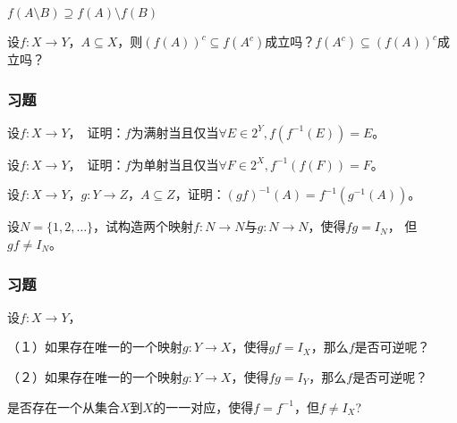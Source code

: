 \documentclass{beamer}
\begin{document}
\begin{CJK*}{UTF8}{gbsn}
\begin{frame}
\begin{Exercise}
    $f(A \setminus B) \supseteq f(A) \setminus f(B)$
    
  \end{Exercise}
  \begin{Exercise}
    设$f:X\to Y$，$A \subseteq X$，则$(f(A))^c \subseteq f(A^c)$成立吗？$ f(A^c)\subseteq (f(A))^c$成立吗？
  \end{Exercise}

\end{frame}

\begin{frame}
  \frametitle{习题}
  \begin{Exercise}
    设$f:X\to Y$，　证明：$f$为满射当且仅当$\forall E \in 2^Y, f(f^{-1}(E)) = E$。
  \end{Exercise}

  \begin{Exercise}
    设$f:X\to Y$，　证明：$f$为单射当且仅当$\forall F \in 2^X, f^{-1}(f(F)) = F$。    
  \end{Exercise}
    \begin{Exercise}
    设$f:X \to Y$，$g:Y \to Z$，$A \subseteq Z$，证明：$(gf)^{-1}(A) = f^{-1}(g^{-1}(A))$。
  \end{Exercise}
  \begin{Exercise}
    设$N=\{1,2,\ldots\}$，试构造两个映射$f:N \to N$与$g:N\to N$，使得$fg = I_N$，
    但$gf \neq I_N$。
  \end{Exercise}
\end{frame}
\begin{frame}
  \frametitle{习题}
 \begin{Exercise}
    设$f:X \to Y$，

    （１）如果存在唯一的一个映射$g:Y\to X$，使得$gf = I_X$，那么$f$是否可逆呢？

    （２）如果存在唯一的一个映射$g:Y\to X$，使得$fg = I_Y$，那么$f$是否可逆呢？

  \end{Exercise}
  \begin{Exercise}
    是否存在一个从集合$X$到$X$的一一对应，使得$f=f^{-1}$，但$f \neq I_X$?
  \end{Exercise}
\end{frame}

\end{CJK*}
\end{document}
